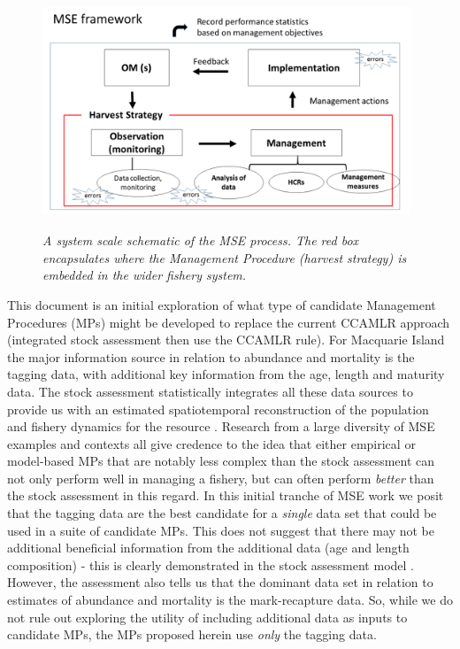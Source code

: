 \documentclass[12pt,a4paper,twoside,times,sky,standard]{csiroreport2017}
\begin{document}
\begin{figure}[hb]
    \begin{center}
        \includegraphics[width=11cm,height=7cm]{MSE.pdf}
    \end{center}
    \caption{\textit{A system scale schematic of the MSE process. The red box encapsulates where the Management Procedure (harvest strategy) is embedded in the wider fishery system.}}
\end{figure}

This document is an initial exploration of what type of candidate Management Procedures (MPs) might be developed to replace the current CCAMLR approach (integrated stock assessment then use the CCAMLR rule). For Macquarie Island the major information source in relation to abundance and mortality is the tagging data, with additional key information from the age, length and maturity data. The stock assessment statistically integrates all these data sources to provide us with an estimated spatiotemporal reconstruction of the population and fishery dynamics for the resource \cite{misa}. Research from a large diversity of MSE examples and contexts \cite{mse,iwc,sbtmp,mprev} all give credence to the idea that either empirical or model-based MPs that are notably less complex than the stock assessment can not only perform well in managing a fishery, but can often perform \emph{better} than the stock assessment in this regard. In this initial tranche of MSE work we posit that the tagging data are the best candidate for a \emph{single} data set that could be used in a suite of candidate MPs. This does not suggest that there may not be additional beneficial information from the additional data (age and length composition) - this is clearly demonstrated in the stock assessment model \cite{misa}. However, the assessment also tells us that the dominant data set in relation to estimates of abundance and mortality is the mark-recapture data. So, while we do not rule out exploring the utility of including additional data as inputs to candidate MPs, the MPs proposed herein use \emph{only} the tagging data.
\end{document}
